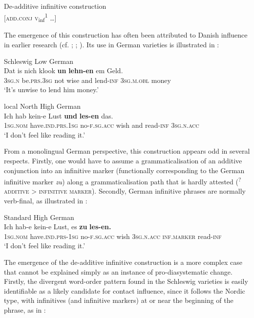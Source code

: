 \documentclass[output=paper]{langsci/langscibook}
\begin{document}
\ea
	\label{ex:hoeder:6}
	De-additive infinitive construction\\
       {[}\textsc{add.conj} \textsc{v}\textsubscript{inf}\textsuperscript{1} …{]}
     \z
       
The emergence of this construction has often been attributed to Danish influence in earlier research (cf. \citealt{Laur.1975}; \citealt{Hoekstra.2009}; \citealt[303--305]{Hoder.2016b}). Its use in German varieties is illustrated in :

 
\ea\label{ex:hoeder:7}
	\ea\label{ex:hoeder:7a}
 	 Schleswig Low German\\
	\gll Dat is nich klook \textbf{un} \textbf{lehn-en} em Geld.\\
     {\textsc{3sg.n}} be.\textsc{prs.3sg} not wise and lend-\textsc{inf} \textsc{3sg.m.obl} money\\
	\glt `It’s unwise to lend him money.'

	\ex\label{ex:hoeder:7b}
		local North High German\\
	\gll Ich hab kein-e Lust \textbf{und} \textbf{les-en} das.\\
     1\textsc{sg.nom} have.\textsc{ind.prs.}1\textsc{sg} no-\textsc{f.sg.acc} wish and read-\textsc{inf} 3\textsc{sg.n.acc}\\
	\glt `I don’t feel like reading it.'
\z
\z

From a monolingual German perspective, this construction appears odd in several respects. Firstly, one would have to assume a grammaticalisation of an additive conjunction into an infinitive marker (functionally corresponding to the German infinitive marker \textit{zu}) along a grammaticalisation path that is hardly attested (\textsuperscript{?}\textsc{additive} > \textsc{infinitive} \textsc{marker}). Secondly, German infinitive phrases are normally verb-final, as illustrated in :

\newpage
\ea\label{ex:hoeder:8}
	Standard High German\\
	\gll Ich hab-e kein-e Lust,{} es \textbf{zu} \textbf{les-en.}\\
     1\textsc{sg.nom} have.\textsc{ind.prs}{}-1\textsc{sg} no\textsc{{}-f.sg.acc} wish 3\textsc{sg.n.acc} \textsc{inf.marker} read-\textsc{inf}\\
	\glt `I don’t feel like reading it.'
\z

The emergence of the de-additive infinitive construction is a more complex case that cannot be explained simply as an instance of pro-diasystematic change. Firstly, the divergent word-order pattern found in the Schleswig varieties is easily identifiable as a likely candidate for contact influence, since it follows the Nordic type, with infinitives (and infinitive markers) at or near the beginning of the phrase, as in :
\end{document}
